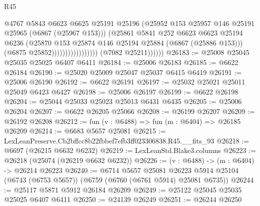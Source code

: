 \begin{lexlean}{R45}
\begin{coremodule}
{                                            @4767
                                            @5843
                                            @6623
                                            @6625
                                            @25191
                                            @25196
                                            (@25952
                                              @153
                                              @25957
                                              @146
                                              @25191
                                              @25965
                                              (@6867 (@25967 @153)))
                                            (@25861
                                              @5841
                                              @252
                                              @6623
                                              @6623
                                              @25194
                                              @6236
                                              (@25870
                                                @153
                                                @25874
                                                @146
                                                @25194
                                                @25884
                                                (@6867 (@25886 @153)))
                                              (@6875 @25852)))))))))))))))))
              (@7082 @25211))))))
@26183 := @25008 @25045 @25035 @25025 @6407 @6411
@26184 := @25006 @26183
@26185 := @6622 @26184
@26190 := @25020 @25009 @25047 @25037 @6415 @6419
@26191 := @25006 @26190
@26192 := @6622 @26191
@26197 := @25032 @25021 @25011 @25049 @6423 @6427
@26198 := @25006 @26197
@26199 := @6622 @26198
@26204 := @25044 @25033 @25023 @25013 @6431 @6435
@26205 := @25006 @26204
@26207 := @6622 @26205 @25066
@26208 := @26199 @26207
@26209 := @26192 @26208
@26212 := fun (v : @6488) => fun (m : @6404) => @26185 @26209
@26214 := @6683 @5657 @25081
@26215 := LexLeanPreserve.Cb2bffcc8b22fbbef7efb3ff023306838.R45.__fits_93
@26218 := @6697 (@26215 @6632 @6232)
@26219 := LexLeanStd.Blake3.columns
@26223 := @26218 (@25074 (@26219 @6632 @6232))
@26226 := (v : @6488) -> (m : @6404) -> @26214 @26223
@26240 := @6714
    @5657
    @25081
    @26223
    @5914
    @25104
    (@6743 (@6753 @5657))
    (@6759 (@6760 (@6761 @5914) @25081 @6735))
@26244 := @25117 @5871 @5912 @26184 @26209
@26249 := @25122 @25045 @25035 @25025 @6407 @6411
@26250 := @24139 @26249
@26251 := @26244 @26250
}
\end{coremodule}
\end{lexlean}
